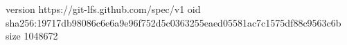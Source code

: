 version https://git-lfs.github.com/spec/v1
oid sha256:19717db98086c6e6a9e96f752d5c0363255eaed05581ac7c1575df88c9563c6b
size 1048672
